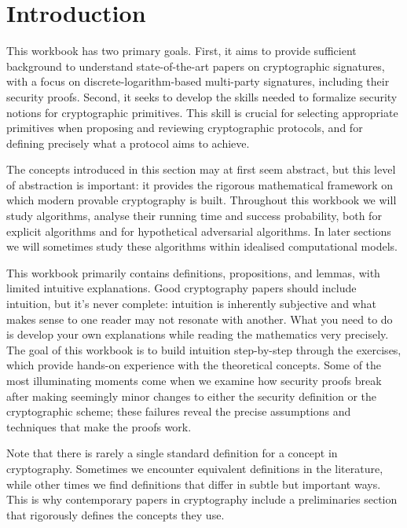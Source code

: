 \section{Introduction}\label{sec:intro}

This workbook has two primary goals.
First, it aims to provide sufficient background to understand state-of-the-art papers on cryptographic signatures, with a focus on discrete-logarithm-based multi-party signatures, including their security proofs.
Second, it seeks to develop the skills needed to formalize security notions for cryptographic primitives.
This skill is crucial for selecting appropriate primitives when proposing and reviewing cryptographic protocols, and for defining precisely what a protocol aims to achieve.

The concepts introduced in this section may at first seem abstract, but this level of abstraction is important: it provides the rigorous mathematical framework on which modern provable cryptography is built.
Throughout this workbook we will study algorithms, analyse their running time and success probability, both for explicit algorithms and for hypothetical adversarial algorithms.
In later sections we will sometimes study these algorithms within idealised computational models.

This workbook primarily contains definitions, propositions, and lemmas, with limited intuitive explanations.
Good cryptography papers should include intuition, but it's never complete: intuition is inherently subjective and what makes sense to one reader may not resonate with another.
What you need to do is develop your own explanations while reading the mathematics very precisely.
The goal of this workbook is to build intuition step-by-step through the exercises, which provide hands-on experience with the theoretical concepts.
Some of the most illuminating moments come when we examine how security proofs break after making seemingly minor changes to either the security definition or the cryptographic scheme; these failures reveal the precise assumptions and techniques that make the proofs work.

Note that there is rarely a single standard definition for a concept in cryptography.
Sometimes we encounter equivalent definitions in the literature, while other times we find definitions that differ in subtle but important ways.
This is why contemporary papers in cryptography include a preliminaries section that rigorously defines the concepts they use.

